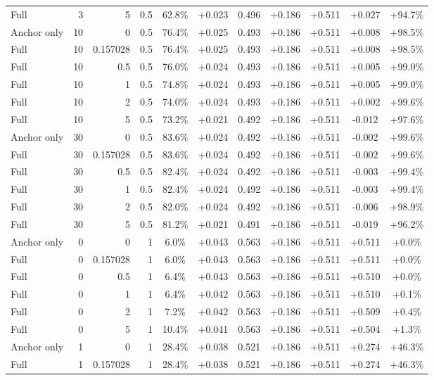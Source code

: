 \begin{table}[htbp]
\begin{tabular}{lrrrccccccc}
Full & 3 & 5 & 0.5 & 62.8\% & +0.023 & 0.496 & +0.186 & +0.511 & +0.027 & +94.7\% \\
Anchor only & 10 & 0 & 0.5 & 76.4\% & +0.025 & 0.493 & +0.186 & +0.511 & +0.008 & +98.5\% \\
Full & 10 & 0.157028 & 0.5 & 76.4\% & +0.025 & 0.493 & +0.186 & +0.511 & +0.008 & +98.5\% \\
Full & 10 & 0.5 & 0.5 & 76.0\% & +0.024 & 0.493 & +0.186 & +0.511 & +0.005 & +99.0\% \\
Full & 10 & 1 & 0.5 & 74.8\% & +0.024 & 0.493 & +0.186 & +0.511 & +0.005 & +99.0\% \\
Full & 10 & 2 & 0.5 & 74.0\% & +0.024 & 0.493 & +0.186 & +0.511 & +0.002 & +99.6\% \\
Full & 10 & 5 & 0.5 & 73.2\% & +0.021 & 0.492 & +0.186 & +0.511 & -0.012 & +97.6\% \\
Anchor only & 30 & 0 & 0.5 & 83.6\% & +0.024 & 0.492 & +0.186 & +0.511 & -0.002 & +99.6\% \\
Full & 30 & 0.157028 & 0.5 & 83.6\% & +0.024 & 0.492 & +0.186 & +0.511 & -0.002 & +99.6\% \\
Full & 30 & 0.5 & 0.5 & 82.4\% & +0.024 & 0.492 & +0.186 & +0.511 & -0.003 & +99.4\% \\
Full & 30 & 1 & 0.5 & 82.4\% & +0.024 & 0.492 & +0.186 & +0.511 & -0.003 & +99.4\% \\
Full & 30 & 2 & 0.5 & 82.0\% & +0.024 & 0.492 & +0.186 & +0.511 & -0.006 & +98.9\% \\
Full & 30 & 5 & 0.5 & 81.2\% & +0.021 & 0.491 & +0.186 & +0.511 & -0.019 & +96.2\% \\
Anchor only & 0 & 0 & 1 & 6.0\% & +0.043 & 0.563 & +0.186 & +0.511 & +0.511 & +0.0\% \\
Full & 0 & 0.157028 & 1 & 6.0\% & +0.043 & 0.563 & +0.186 & +0.511 & +0.511 & +0.0\% \\
Full & 0 & 0.5 & 1 & 6.4\% & +0.043 & 0.563 & +0.186 & +0.511 & +0.510 & +0.0\% \\
Full & 0 & 1 & 1 & 6.4\% & +0.042 & 0.563 & +0.186 & +0.511 & +0.510 & +0.1\% \\
Full & 0 & 2 & 1 & 7.2\% & +0.042 & 0.563 & +0.186 & +0.511 & +0.509 & +0.4\% \\
Full & 0 & 5 & 1 & 10.4\% & +0.041 & 0.563 & +0.186 & +0.511 & +0.504 & +1.3\% \\
Anchor only & 1 & 0 & 1 & 28.4\% & +0.038 & 0.521 & +0.186 & +0.511 & +0.274 & +46.3\% \\
Full & 1 & 0.157028 & 1 & 28.4\% & +0.038 & 0.521 & +0.186 & +0.511 & +0.274 & +46.3\% \\

\end{tabular}
\end{table}
